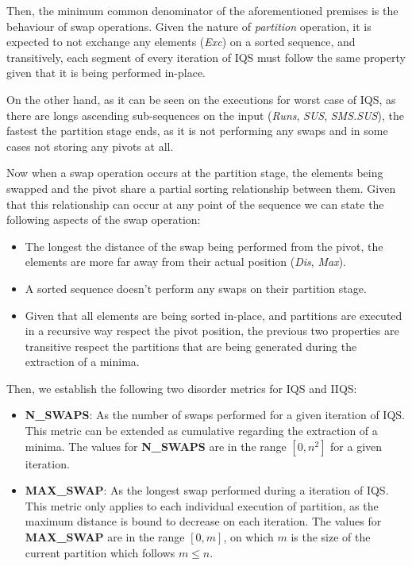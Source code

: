 Then, the minimum common denominator of the aforementioned premises is the behaviour of swap operations. Given the nature of \textit{partition} operation, it is expected to not exchange any elements (\textit{Exc}) on a sorted sequence, and transitively, each segment of every iteration of IQS must follow the same property given that it is being performed in-place.

On the other hand, as it can be seen on the executions for worst case of IQS, as there are longs ascending sub-sequences on the input (\textit{Runs}, \textit{SUS}, \textit{SMS.SUS}), the fastest the partition stage ends, as it is not performing any swaps and in some cases not storing any pivots at all.

Now when a swap operation occurs at the partition stage, the elements being swapped and the pivot share a partial sorting relationship between them. Given that this relationship can occur at any point of the sequence we can state the following aspects of the swap operation:

\begin{itemize}
    \item The longest the distance of the swap being performed from the pivot, the elements are more far away from their actual position (\textit{Dis}, \textit{Max}).
    \item A sorted sequence doesn't perform any swaps on their partition stage.
    \item Given that all elements are being sorted in-place, and partitions are executed in a recursive way respect the pivot position, the previous two properties are transitive respect the partitions that are being generated during the extraction of a minima.
\end{itemize}

Then, we establish the following two disorder metrics for IQS and IIQS:

\begin{itemize}
    \item \textbf{N\_SWAPS}: As the number of swaps performed for a given iteration of IQS. This metric can be extended as cumulative regarding the extraction of a minima. The values for \textbf{N\_SWAPS} are in the range $[0, n^2]$ for a given iteration.
    \item \textbf{MAX\_SWAP}: As the longest swap performed during a iteration of IQS. This metric only applies to each individual execution of partition, as the maximum distance is bound to decrease on each iteration. The values for \textbf{MAX\_SWAP} are in the range $[0, m]$, on which $m$ is the size of the current partition which follows $m \leq n$.
\end{itemize}

